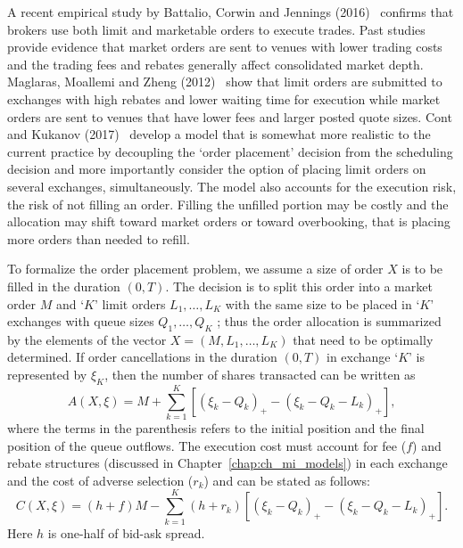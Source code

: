 A recent empirical study by Battalio, Corwin and Jennings (2016)~\cite{battcorjen} confirms that brokers use both limit and marketable orders to execute trades. Past studies provide evidence that market orders are sent to venues with lower trading costs and the trading fees and rebates generally affect consolidated market depth. Maglaras, Moallemi and Zheng (2012)~\cite{magmoazhe} show that limit orders are submitted to exchanges with high rebates and lower waiting time for execution while market orders are sent to venues that have lower fees and larger posted quote sizes. Cont and Kukanov (2017)~\cite{contk} develop a model that is somewhat more realistic to the current practice by decoupling the `order placement' decision from the scheduling decision and more importantly consider the option of placing limit orders on several exchanges, simultaneously. The model also accounts for the execution risk, the risk of not filling an order. Filling the unfilled portion may be costly and the allocation may shift toward market orders or toward overbooking, that is placing more orders than needed to refill.


To formalize the order placement problem, we assume a size of order $X$ is to be filled in the duration $(0,T)$. The decision is to split this order into a market order $M$ and `$K$' limit orders $L_1, \ldots, L_K$ with the same size to be placed in `$K$' exchanges with queue sizes $Q_1, \ldots, Q_K$ ; thus the order allocation is summarized by the elements of the vector $X=(M, L_1, \ldots, L_K)$ that need to be optimally determined. If order cancellations in the duration $(0,T)$ in exchange `$K$' is represented by $\xi_K$, then the number of shares transacted can be written as 
	\begin{equation} \label{eqn:axe}
	A(X,\xi)= M + \sum_{k=1}^K \left[ (\xi_k - Q_k)_+ - (\xi_k - Q_k - L_k)_+ \right],
	\end{equation}
where the terms in the parenthesis refers to the initial position and the final position of the queue outflows. The execution cost must account for fee ($f$) and rebate structures (discussed in Chapter~\ref{chap:ch_mi_models}) in each exchange and the cost of adverse selection ($r_k$) and can be stated as follows:
	\begin{equation}\label{eqn:cxe}
	C(X,\xi)= (h+f) M - \sum_{k=1}^K (h+r_k) \left[ (\xi_k - Q_k)_+ - (\xi_k - Q_k - L_k)_+ \right].
	\end{equation}
Here $h$ is one-half of bid-ask spread. 


